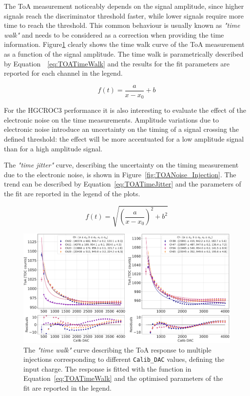 The ToA measurement noticeably depends on the signal amplitude, since higher signals reach the discriminator threshold faster, while lower signals require more time to reach the threshold. This common behaviour is usually known as \textit{"time walk"} and needs to be considered as a correction when providing the time information.
Figure\ref{fig:TOA_Injection} clearly shows the time walk curve of the ToA measurement as a function of the signal amplitude. The time walk is parametrically described by Equation~~\ref{eq:TOATimeWalk} and the results for the fit parameters are reported for each channel in the legend.

\begin{equation}
    f(t) = \frac{a}{x-x_0}+b
\label{eq:TOATimeWalk}
\end{equation}

\bigbreak

For the HGCROC3 performance it is also interesting to evaluate the effect of the electronic noise on the time measurements. Amplitude variations due to electronic noise introduce an uncertainty on the timing of a signal crossing the defined threshold: the effect will be more accentuated for a low amplitude signal than for a high amplitude signal.

The \textit{"time jitter"} curve, describing the uncertainty on the timing measurement due to the electronic noise, is shown in Figure~\ref{fig:TOANoise_Injection}.
The trend can be described by Equation~\ref{eq:TOATimeJitter} and the parameters of the fit are reported in the legend of the plots.

\begin{equation}
    f(t) = \sqrt{\left(\frac{a}{x-x_0}\right)^2+b^2}
\label{eq:TOATimeJitter}
\end{equation}

\begin{figure}
    \centering
    \includegraphics[width=0.75\linewidth]{Figures/HGCAL/TOA_Injection.pdf}
    \caption{The \textit{"time walk"} curve describing the ToA response to multiple injections corresponding to different \texttt{Calib\_DAC} values, defining the input charge. The  response is fitted with the function in Equation~\ref{eq:TOATimeWalk} and the optimised parameters of the fit are reported in the legend.}
    \label{fig:TOA_Injection}
\end{figure}


